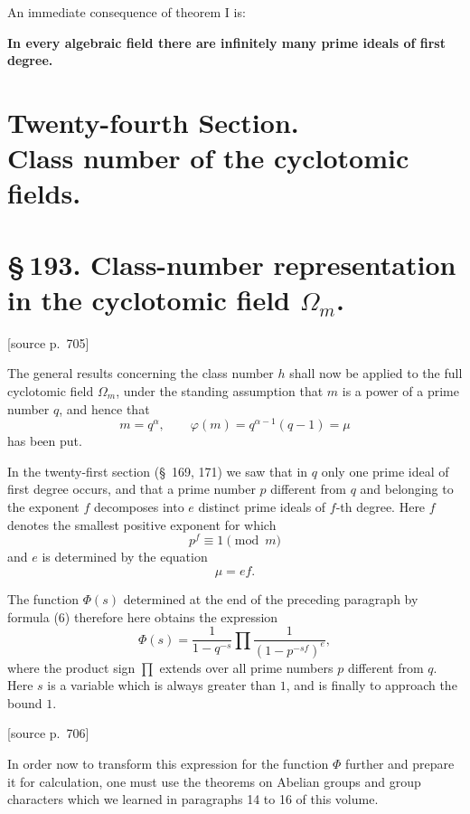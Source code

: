 \documentclass[11pt]{article}
\newcommand{\srcpage}[1]{\par\medskip\noindent\textsf{[source p.~#1]}\par\smallskip}
\begin{document}
An immediate consequence of theorem I is:
\begin{center}
\textbf{In every algebraic field there are infinitely many prime ideals of first degree.}
\end{center}

\section*{Twenty-fourth Section.\\Class number of the cyclotomic fields.}
\section*{\S\,193. Class-number representation in the cyclotomic field $\Omega_m$.}

\srcpage{705}
The general results concerning the class number $h$ shall now be applied to the full cyclotomic field $\Omega_m$, under the standing assumption that $m$ is a power of a prime number $q$, and hence that
\begin{equation}
m=q^\alpha,\qquad \varphi(m)=q^{\alpha-1}(q-1)=\mu
\tag{1}
\end{equation}
has been put.

In the twenty-first section (\S~169, 171) we saw that in $q$ only one prime ideal of first degree occurs, and that a prime number $p$ different from $q$ and belonging to the exponent $f$ decomposes into $e$ distinct prime ideals of $f$-th degree. Here $f$ denotes the smallest positive exponent for which
\begin{equation}
p^f\equiv1\pmod m
\tag{2}
\end{equation}
and $e$ is determined by the equation
\begin{equation}
\mu=ef.
\tag{3}
\end{equation}

The function $\Phi(s)$ determined at the end of the preceding paragraph by formula (6) therefore here obtains the expression
\begin{equation}
\Phi(s)=\frac1{1-q^{-s}}\prod\frac1{(1-p^{-sf})^e},
\tag{4}
\end{equation}
where the product sign $\prod$ extends over all prime numbers $p$ different from $q$. Here $s$ is a variable which is always greater than $1$, and is finally to approach the bound $1$.

\srcpage{706}
In order now to transform this expression for the function $\Phi$ further and prepare it for calculation, one must use the theorems on Abelian groups and group characters which we learned in paragraphs 14 to 16 of this volume.
\end{document}
